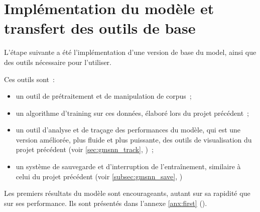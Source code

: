 \section{Implémentation du modèle et transfert des outils de base}
L'étape suivante a été l'implémentation d'une version de base du \gls{model}, ainsi que des outils nécessaire pour l'utiliser.

Ces outils sont~:
\begin{itemize}
	\item un outil de prétraitement et de manipulation de \gls{corpus}~;
	\item un algorithme d'\gls{training} sur ces données, élaboré lors du projet précédent~;
	\item un outil d'analyse et de traçage des performances du modèle, qui est une version améliorée, plus fluide et plus puissante, des outils de visualisation du projet précédent (voir \autoref{sec:gmsnn_track}, )~;
	\item un système de sauvegarde et d'interruption de l'entraînement, similaire à celui du projet précédent (voir \autoref{subsec:gmsnn_save}, )
\end{itemize}
\vspace{1em}

Les premiers résultats du modèle sont encourageants, autant sur sa rapidité que sur ses performance.
Ils sont présentés dans l'annexe \ref{anx:first} ().
